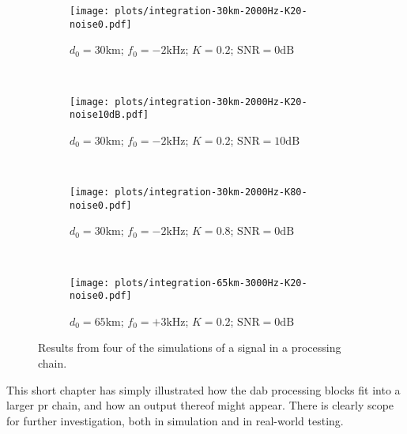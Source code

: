 \documentclass[class=report,11pt,crop=false]{standalone}
\begin{document}
\begin{figure}[htbp]
    \centering
    \captionsetup{type=figure}
    \begin{subfigure}[t]{0.49\textwidth}
        \centering
        \captionsetup{type=figure}
        \texttt{[image: plots/integration-30km-2000Hz-K20-noise0.pdf]}
        \caption{\(d_0 = 30\si{\kilo\metre}\); \(f_0 = -2\si{\kilo\hertz}\); \(K = 0.2\); \(\textrm{SNR} = 0\si{\deci\bel}\)}
        \label{fig:integration-simulation-1}
    \end{subfigure}%
    ~~
    \begin{subfigure}[t]{0.49\textwidth}
        \centering
        \captionsetup{type=figure}
        \texttt{[image: plots/integration-30km-2000Hz-K20-noise10dB.pdf]}
        \caption{\(d_0 = 30\si{\kilo\metre}\); \(f_0 = -2\si{\kilo\hertz}\); \(K = 0.2\); \(\textrm{SNR} = 10\si{\deci\bel}\)}
        \label{fig:integration-simulation-2}
    \end{subfigure}%
    \\
    \begin{subfigure}[t]{0.49\textwidth}
        \centering
        \captionsetup{type=figure}
        \texttt{[image: plots/integration-30km-2000Hz-K80-noise0.pdf]}
        \caption{\(d_0 = 30\si{\kilo\metre}\); \(f_0 = -2\si{\kilo\hertz}\); \(K = 0.8\); \(\textrm{SNR} = 0\si{\deci\bel}\)}
        \label{fig:integration-simulation-3}
    \end{subfigure}%
    ~~
    \begin{subfigure}[t]{0.49\textwidth}
        \centering
        \captionsetup{type=figure}
        \texttt{[image: plots/integration-65km-3000Hz-K20-noise0.pdf]}
        \caption{\(d_0 = 65\si{\kilo\metre}\); \(f_0 = +3\si{\kilo\hertz}\); \(K = 0.2\); \(\textrm{SNR} = 0\si{\deci\bel}\)}
        \label{fig:integration-simulation-4}
    \end{subfigure}%
    \caption{Results from four of the simulations of a  signal in a  processing chain.}
    \label{fig:integration-simulation-all}
\end{figure}

This short chapter has simply illustrated how the \gls{dab} processing blocks fit into a larger \gls{pr} chain, and how an output thereof might appear. There is clearly scope for further investigation, both in simulation and in real-world testing.

\ifstandalone

\printnoidxglossary[type=\acronymtype,nonumberlist]
\fi
\end{document}
